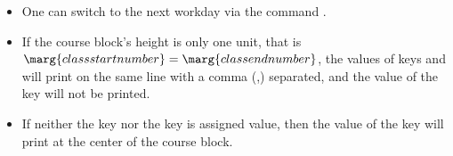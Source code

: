\documentclass[letterpaper]{l3doc}
\begin{document}
\begin{center}
    \noindent{}
\end{center}

\begin{itemize}
    \item One can switch to the next workday via the command .
    \item If the course block's height is only one unit, that is $\marg{class start number} = \marg{class end number}$, the values of keys  and  will print on the same line with a comma (,) separated, and the value of the key  will not be printed.
    \item If neither the key  nor the key  is assigned value, then the value of the key  will print at the center of the course block.
\end{itemize}


\end{document}
